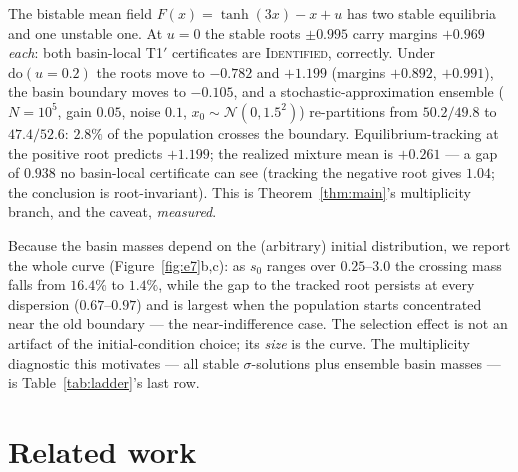 \documentclass[pmlr]{jmlr}
\newcommand{\doop}{\mathrm{do}}
\newcommand{\Cid}{\textsc{Identified}}
\begin{document}
The bistable mean field $F(x) = \tanh(3x) - x + u$ has two stable equilibria and one unstable
one. At $u = 0$ the stable roots $\pm 0.995$ carry margins $+0.969$ \emph{each}: both
basin-local T1$'$ certificates are \Cid, correctly. Under $\doop(u{=}0.2)$ the roots
move to $-0.782$ and $+1.199$ (margins $+0.892$, $+0.991$), the basin boundary moves to
$-0.105$, and a stochastic-approximation ensemble ($N = 10^5$, gain $0.05$, noise $0.1$,
$x_0 \sim \mathcal{N}(0, 1.5^2)$) re-partitions from $50.2/49.8$ to $47.4/52.6$: $2.8\%$ of the
population crosses the boundary. Equilibrium-tracking at the positive root predicts $+1.199$;
the realized mixture mean is $+0.261$ --- a gap of $0.938$ no basin-local certificate can see
(tracking the negative root gives $1.04$; the conclusion is root-invariant). This is
Theorem~\ref{thm:main}'s multiplicity branch, and the \citet{blom2019beyond} caveat,
\emph{measured}.

Because the basin masses depend on the (arbitrary) initial distribution, we report the whole
curve (Figure~\ref{fig:e7}b,c): as $s_0$ ranges over $0.25$--$3.0$ the crossing mass falls from
$16.4\%$ to $1.4\%$, while the gap to the tracked root persists at every dispersion
($0.67$--$0.97$) and is largest when the population starts concentrated near the old boundary
--- the near-indifference case. The selection effect is not an artifact of the initial-condition
choice; its \emph{size} is the curve. The multiplicity diagnostic this motivates --- all stable
$\sigma$-solutions plus ensemble basin masses --- is Table~\ref{tab:ladder}'s last row.

\section{Related work}\label{sec:related}
\end{document}
